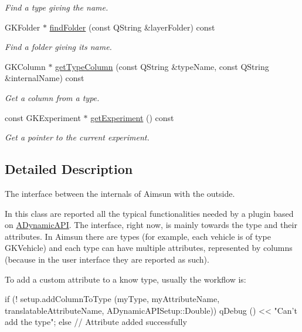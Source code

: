 \begin{DoxyCompactItemize}
\begin{DoxyCompactList}\small\item\em Find a type giving the name. \end{DoxyCompactList}\item 
G\+K\+Folder $\ast$ \hyperlink{classADynamicAPISetup_a91b16dc7b90f8ff9eba045dde9024f76}{find\+Folder} (const Q\+String \&layer\+Folder) const 
\begin{DoxyCompactList}\small\item\em Find a folder giving its name. \end{DoxyCompactList}\item 
G\+K\+Column $\ast$ \hyperlink{classADynamicAPISetup_a27020d13f933b59238ca293b80be6537}{get\+Type\+Column} (const Q\+String \&type\+Name, const Q\+String \&internal\+Name) const 
\begin{DoxyCompactList}\small\item\em Get a column from a type. \end{DoxyCompactList}\item 
const G\+K\+Experiment $\ast$ \hyperlink{classADynamicAPISetup_ab26fb83aaedf69f2ed8064a5760a5210}{get\+Experiment} () const 
\begin{DoxyCompactList}\small\item\em Get a pointer to the current experiment. \end{DoxyCompactList}\end{DoxyCompactItemize}


\subsection{Detailed Description}
The interface between the internals of Aimsun with the outside. 

In this class are reported all the typical functionalities needed by a plugin based on \hyperlink{classADynamicAPI}{A\+Dynamic\+A\+PI}. The interface, right now, is mainly towards the type and their attributes. In Aimsun there are types (for example, each vehicle is of type G\+K\+Vehicle) and each type can have multiple attributes, represented by columns (because in the user interface they are reported as such).

To add a custom attribute to a know type, usually the workflow is\+: \begin{DoxyVerb}if (! setup.addColumnToType (myType, myAttributeName, translatableAttributeName, ADynamicAPISetup::Double))
    qDebug () << "Can't add the type";
else
    // Attribute added successfully
\end{DoxyVerb}



